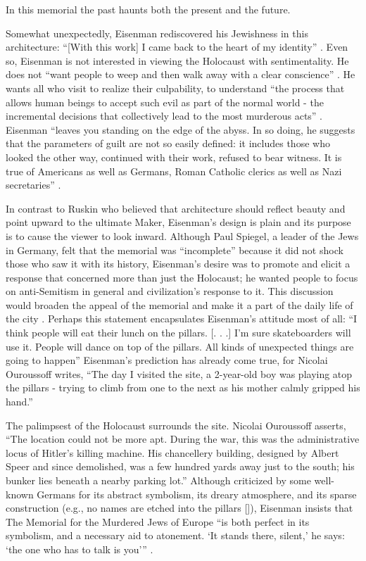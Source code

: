 In this memorial the past haunts both the present and the future.

Somewhat unexpectedly, Eisenman rediscovered his Jewishness in this
architecture: “[With this work] I came back to the heart of my
identity” \citep{quigley2005}.  Even so, Eisenman is not interested in
viewing the Holocaust with sentimentality.  He does not
``want people to weep and then walk
away with a clear conscience'' \citep{ouroussoff2005}.  He
wants all who visit to realize their culpability, to understand ``the
process that allows human beings to accept such evil as part of the
normal world - the incremental decisions that collectively lead to the
most murderous acts'' \citep{ouroussoff2005}. Eisenman “leaves you standing on the edge of the
abyss.  In so doing, he suggests that the parameters of guilt are not
so easily defined: it includes those who looked the other way,
continued with their work, refused to bear witness.  It is true of
Americans as well as Germans, Roman Catholic clerics as well as Nazi
secretaries” \citep{ouroussoff2005}. 

In contrast to Ruskin who believed that architecture should reflect
beauty and point upward to the ultimate Maker, Eisenman’s design is
plain and its purpose is to cause the viewer to look inward.  Although
Paul Spiegel, a leader of the Jews in Germany, felt that the memorial
was “incomplete” because it did not shock those who saw it with its
history, Eisenman’s desire was to promote and elicit a response that
concerned more than just the Holocaust; he wanted people to focus on
anti-Semitism in general and civilization’s response to it.  This
discussion would broaden the appeal of the memorial and make it a part
of the daily life of the city \citep{quigley2005}.  Perhaps this statement
encapsulates Eisenman’s attitude most of all:
“I think people will eat their lunch on
the pillars. [. . .] I’m sure skateboarders will use it.  People will
dance on top of the pillars.  All kinds of unexpected things are going
to happen” \citep{quigley2005}  Eisenman’s prediction has already come
true, for Nicolai Ouroussoff writes, “The day I visited the
site, a 2-year-old boy was playing atop the pillars - trying to climb
from one to the next as his mother calmly gripped his hand.” \citep{ouroussoff2005}

The palimpsest of the Holocaust surrounds the site.  Nicolai
Ouroussoff asserts, “The location could not be more
apt.  During the war, this was the administrative locus of
Hitler's killing machine.  His chancellery building,
designed by Albert Speer and since demolished, was a
few hundred yards away just to the south; his bunker lies beneath a
nearby parking lot.” \citep{ouroussoff2005}  Although criticized by some well-known Germans
for its abstract symbolism, its dreary atmosphere, and its sparse
construction \citep{quigley2005} (e.g., no names are etched into the pillars
[\citealp{brunberg2012}]), Eisenman insists that The Memorial for the Murdered Jews
of Europe “is both perfect in its symbolism, and a necessary aid to
atonement.  ‘It stands there, silent,’ he says: ‘the one who has to
talk is you’” \citep{quigley2005}.

